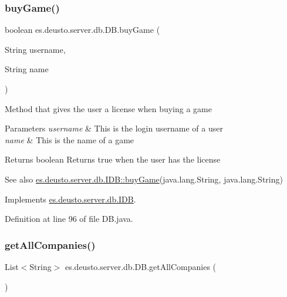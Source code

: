 \subsubsection{\texorpdfstring{buy\+Game()}{buyGame()}}
{\footnotesize\ttfamily boolean es.\+deusto.\+server.\+db.\+D\+B.\+buy\+Game (\begin{DoxyParamCaption}\item[{String}]{username,  }\item[{String}]{name }\end{DoxyParamCaption})}

Method that gives the user a license when buying a game 
\begin{DoxyParams}{Parameters}
{\em username} & This is the login username of a user \\
\hline
{\em name} & This is the name of a game \\
\hline
\end{DoxyParams}
\begin{DoxyReturn}{Returns}
boolean Returns true when the user has the license 
\end{DoxyReturn}
\begin{DoxySeeAlso}{See also}
\hyperlink{interfacees_1_1deusto_1_1server_1_1db_1_1_i_d_b_ab1076d02bd6b4da29d0e99e1310048b6}{es.\+deusto.\+server.\+db.\+I\+D\+B\+::buy\+Game}(java.\+lang.\+String, java.\+lang.\+String) 
\end{DoxySeeAlso}


Implements \hyperlink{interfacees_1_1deusto_1_1server_1_1db_1_1_i_d_b_ab1076d02bd6b4da29d0e99e1310048b6}{es.\+deusto.\+server.\+db.\+I\+DB}.



Definition at line 96 of file D\+B.\+java.

\mbox{\label{classes_1_1deusto_1_1server_1_1db_1_1_d_b_a59802aeefdd9d445152fbd548a964708}} 
\subsubsection{\texorpdfstring{get\+All\+Companies()}{getAllCompanies()}}
{\footnotesize\ttfamily List$<$String$>$ es.\+deusto.\+server.\+db.\+D\+B.\+get\+All\+Companies (\begin{DoxyParamCaption}{ }\end{DoxyParamCaption})}


